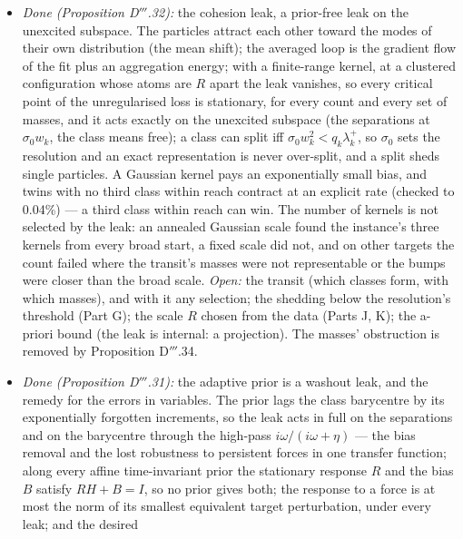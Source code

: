 \begin{enumerate}[label=\arabic*.,leftmargin=*]
\begin{itemize}
      the trajectory and at the stationary point, formally at noise levels outside the expansion); the higher orders;
      the real loop beyond 300 time units; references in $\R^n$.
    \item \emph{Done (Proposition D$'''$.32):} the cohesion leak, a prior-free leak on the unexcited subspace. The
      particles attract each other toward the modes of their own distribution (the mean shift); the averaged loop is
      the gradient flow of the fit plus an aggregation energy; with a finite-range kernel, at a clustered
      configuration whose atoms are $R$ apart the leak vanishes, so every critical point of the unregularised loss is
      stationary, for every count and every set of masses, and it acts exactly on the unexcited subspace (the
      separations at $\sigma_0w_k$, the class means free); a class can split iff $\sigma_0w_k^2 < q_k\lambda^+_k$, so
      $\sigma_0$ sets the resolution and an exact representation is never over-split, and a split sheds single
      particles. A Gaussian kernel pays an exponentially small bias, and twins with no third class within reach
      contract at an explicit rate (checked to 0.04\%) --- a third class within reach can win. The number of kernels
      is not selected by the leak: an annealed Gaussian scale found the instance's three kernels from every broad
      start, a fixed scale did not, and on other targets the count failed where the transit's masses were not
      representable or the bumps were closer than the broad scale. \emph{Open:} the transit (which classes form, with
      which masses), and with it any selection; the shedding below the resolution's threshold (Part G); the scale $R$
      chosen from the data (Parts J, K); the a-priori bound (the leak is internal: a projection). The masses'
      obstruction is removed by Proposition D$'''$.34.
    \item \emph{Done (Proposition D$'''$.31):} the adaptive prior is a washout leak, and the remedy for the errors in
      variables. The prior lags the class barycentre by its exponentially forgotten increments, so the leak acts in
      full on the separations and on the barycentre through the high-pass $i\omega/(i\omega + \eta)$ --- the bias
      removal and the lost robustness to persistent forces in one transfer function; along every affine time-invariant
      prior the stationary response $R$ and the bias $B$ satisfy $RH + B = I$, so no prior gives both; the response to
      a force is at most the norm of its smallest equivalent target perturbation, under every leak; and the desired

\end{itemize}
\end{enumerate}
